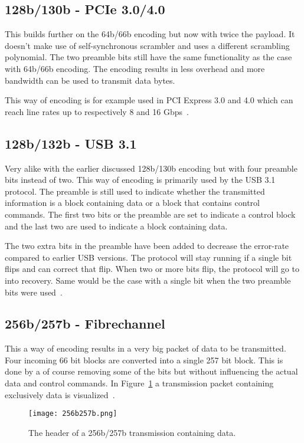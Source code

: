 \subsection{128b/130b - PCIe 3.0/4.0}
This builds further on the 64b/66b encoding but now with twice the payload. It doesn't make use of self-synchronous scrambler and uses a different scrambling polynomial. The two preamble bits still have the same functionality as the case with 64b/66b encoding. The encoding results in less overhead and more bandwidth can be used to transmit data bytes. 

This way of encoding is for example used in PCI Express 3.0 and 4.0 which can reach line rates up to respectively 8 and 16 Gbps~\cite{PCIE}.

\subsection{128b/132b - USB 3.1}
Very alike with the earlier discussed 128b/130b encoding but with four preamble bits instead of two. This way of encoding is primarily used by the USB 3.1 protocol. The preamble is still used to indicate whether the transmitted information is a block containing data or a block that contains control commands. The first two bits or the preamble are set to indicate a control block and the last two are used to indicate a block containing data.

The two extra bits in the preamble have been added to decrease the error-rate compared to earlier USB versions. The protocol will stay running if a single bit flips and can correct that flip. When two or more bits flip, the protocol will go to into recovery. Same would be the case with a single bit when the two preamble bits were used~\cite{USB3.1}.

\subsection{256b/257b - Fibrechannel}
This a way of encoding results in a very big packet of data to be transmitted. Four incoming 66 bit blocks are converted into a single 257 bit block. This is done by a of course removing some of the bits but without influencing the actual data and control commands. In Figure~\ref{fig:256257_data_header} a transmission packet containing exclusively data is visualized~\cite{256b/257b}.

\begin{figure}[ht]
	\centering
	\texttt{[image: 256b257b.png]}	
	\caption{The header of a 256b/257b transmission containing data.}
	\label{fig:256257_data_header}
\end{figure}

